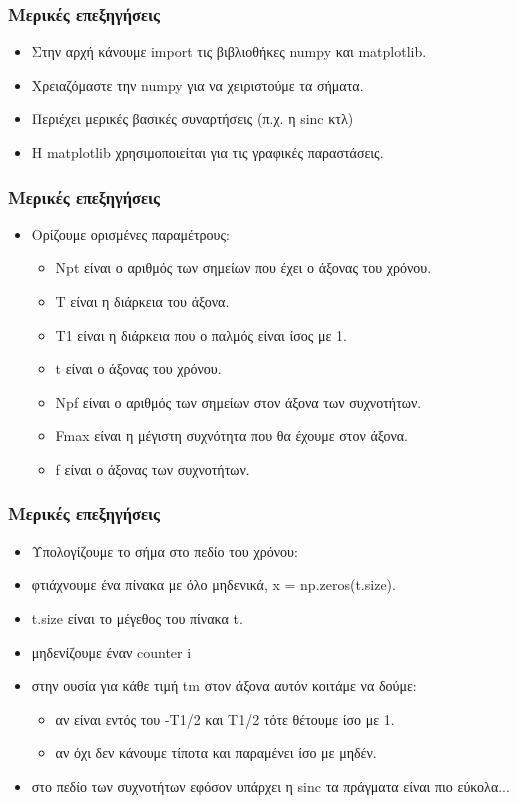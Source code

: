 \documentclass[9pt]{beamer}
\begin{document}
	\begin{frame}
		\frametitle{Μερικές επεξηγήσεις}
		
		\begin{itemize}
			\item Στην αρχή κάνουμε import τις βιβλιοθήκες numpy και matplotlib. 
			\item Χρειαζόμαστε την numpy για να χειριστούμε τα σήματα. 
			\item Περιέχει μερικές βασικές συναρτήσεις (π.χ. η sinc κτλ)
			\item Η matplotlib χρησιμοποιείται για τις γραφικές παραστάσεις.
		\end{itemize}	
	\end{frame}	

	\begin{frame}
	\frametitle{Μερικές επεξηγήσεις}
	
	\begin{itemize}
		\item Ορίζουμε ορισμένες παραμέτρους:
		\begin{itemize}
			\item Npt είναι ο αριθμός των σημείων που έχει ο άξονας του χρόνου.
			\item T είναι η διάρκεια του άξονα.
			\item Τ1 είναι η διάρκεια που ο παλμός είναι ίσος με 1.
			\item t είναι ο άξονας του χρόνου.
			\item Npf είναι ο αριθμός των σημείων στον άξονα των συχνοτήτων.
			\item Fmax είναι η μέγιστη συχνότητα που θα έχουμε στον άξονα.
			\item f είναι ο άξονας των συχνοτήτων.
		\end{itemize}
	\end{itemize}	
	\end{frame}

	\begin{frame}
	\frametitle{Μερικές επεξηγήσεις}
	
	\begin{itemize}
		\item Υπολογίζουμε το σήμα στο πεδίο του χρόνου:
		\item φτιάχνουμε ένα πίνακα με όλο μηδενικά, x = np.zeros(t.size).
		\item t.size είναι το μέγεθος του πίνακα t.
		\item μηδενίζουμε έναν counter i
		\item στην ουσία για κάθε τιμή tm στον άξονα αυτόν κοιτάμε να δούμε:
		\begin{itemize}
			\item αν είναι εντός του -Τ1/2 και Τ1/2 τότε θέτουμε ίσο με 1.
			\item αν όχι δεν κάνουμε τίποτα και παραμένει ίσο με μηδέν.
		\end{itemize}
		\item στο πεδίο των συχνοτήτων εφόσον υπάρχει η sinc τα πράγματα είναι πιο εύκολα...		
	\end{itemize}	
	\end{frame}
\end{document}
